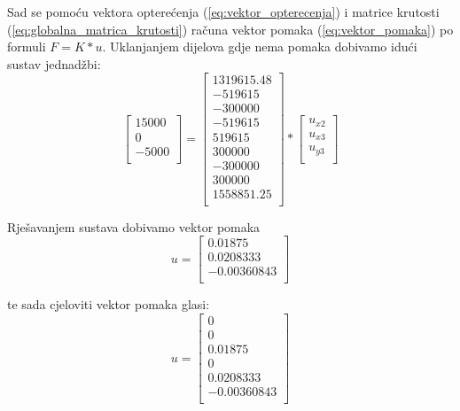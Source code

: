 \documentclass[a4paper,twoside,12pt]{memoir} %
\begin{document}
Sad se pomoću vektora opterećenja (\ref{eq:vektor_opterecenja}) i matrice krutosti (\ref{eq:globalna_matrica_krutosti}) računa vektor pomaka (\ref{eq:vektor_pomaka}) po formuli $F = K * u $. Uklanjanjem dijelova gdje nema pomaka dobivamo idući sustav jednadžbi:
\begin{equation}
\label{eq:racunanje_pomaka}
    \begin{bmatrix}
    15000 \\ 0 \\ -5000 \\
    \end{bmatrix}
    =
    \begin{bmatrix}
    1319615.48 \\ -519615 \\ -300000 \\
    -519615 \\ 519615 \\ 300000 \\
    -300000 \\ 300000 \\ 1558851.25 \\
    \end{bmatrix}
    *    
    \begin{bmatrix}
    u_{x2} \\ u_{x3} \\ u_{y3} \\
    \end{bmatrix}
\end{equation}

Rješavanjem sustava dobivamo vektor pomaka
\begin{equation}
\label{eq:vektor_pomaka_kratki}
    u =
    \begin{bmatrix}
    0.01875 \\ 0.0208333 \\ -0.00360843 \\
    \end{bmatrix}
\end{equation}

te sada cjeloviti vektor pomaka glasi:
\begin{equation}
\label{eq:vektor_pomaka_cijeli}
    u =
    \begin{bmatrix}
    0 \\ 0 \\ 0.01875 \\ 0 \\ 0.0208333 \\ -0.00360843 \\
    \end{bmatrix}
\end{equation}
\end{document}
